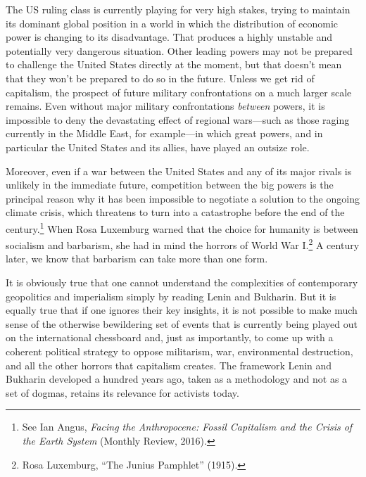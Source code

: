 The US ruling class is currently playing for very high stakes, trying to maintain its dominant global position in a world in which the distribution of economic power is changing to its disadvantage. That produces a highly unstable and potentially very dangerous situation. Other leading powers may not be prepared to challenge the United States directly at the moment, but that doesn't mean that they won't be prepared to do so in the future. Unless we get rid of capitalism, the prospect of future military confrontations on a much larger scale remains. Even without major military confrontations \emph{between} powers, it is impossible to deny the devastating effect of regional wars---such as those raging currently in the Middle East, for example---in which great powers, and in particular the United States and its allies, have played an outsize role.

Moreover, even if a war between the United States and any of its major rivals is unlikely in the immediate future, competition between the big powers is the principal reason why it has been impossible to negotiate a solution to the ongoing climate crisis, which threatens to turn into a catastrophe before the end of the century.\footnote{See Ian Angus, \emph{Facing the Anthropocene: Fossil Capitalism and the Crisis of the Earth System} (Monthly Review, 2016).} When Rosa Luxemburg warned that the choice for humanity is between socialism and barbarism, she had in mind the horrors of World War I.\footnote{Rosa Luxemburg, ``The Junius Pamphlet'' (1915).} A century later, we know that barbarism can take more than one form.

It is obviously true that one cannot understand the complexities of contemporary geopolitics and imperialism simply by reading Lenin and Bukharin. But it is equally true that if one ignores their key insights, it is not possible to make much sense of the otherwise bewildering set of events that is currently being played out on the international chessboard and, just as importantly, to come up with a coherent political strategy to oppose militarism, war, environmental destruction, and all the other horrors that capitalism creates. The framework Lenin and Bukharin developed a hundred years ago, taken as a methodology and not as a set of dogmas, retains its relevance for activists today.

